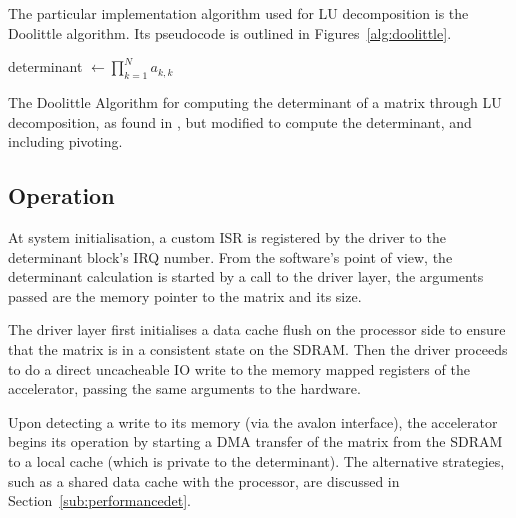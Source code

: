 \documentclass[]{article}
\begin{document}
The particular implementation algorithm used for LU decomposition is the Doolittle algorithm. Its pseudocode is outlined in Figures~\ref{alg:doolittle}.
\begin{algorithm}[htbp]
	\SetAlgoLined



	determinant $\leftarrow \prod_{k=1}^N a_{k,k}$
	\bigskip

	\caption{The Doolittle Algorithm for computing the determinant of a matrix through LU decomposition, as found in \cite{LUgen}, but modified to compute the determinant, and including pivoting.}
	\label{alg:doolittle}
\end{algorithm}


\subsection{Operation} %
\label{sub:operationdet}


At system initialisation, a custom ISR is registered by the driver to the determinant block’s IRQ number. From the software’s point of view, the determinant calculation is started by a call to the driver layer, the arguments passed are the memory pointer to the matrix and its size.

The driver layer first initialises a data cache flush on the processor side to ensure that the matrix is in a consistent state on the SDRAM. Then the driver proceeds to do a direct uncacheable IO write to the memory mapped registers of the accelerator, passing the same arguments to the hardware. 

Upon detecting a write to its memory (via the avalon interface), the accelerator begins its operation by starting a DMA transfer of the matrix from the SDRAM to a local cache (which is private to the determinant). The alternative strategies, such as a shared data cache with the processor, are discussed in Section~\ref{sub:performancedet}.
\end{document}
